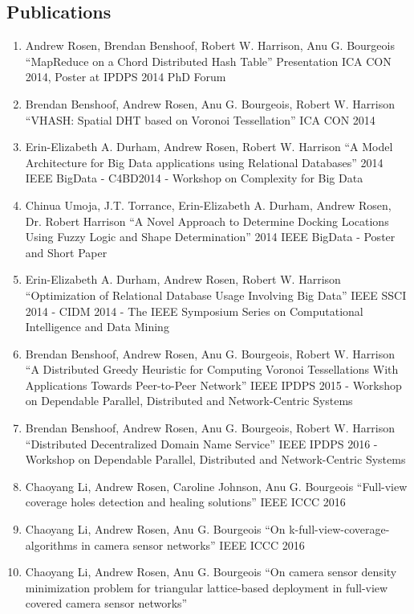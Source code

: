 \documentclass{res}
\begin{document}
\begin{resume}
\section{Publications}
	\begin{enumerate}
	\item Andrew Rosen, Brendan Benshoof, Robert W. Harrison, Anu G. Bourgeois
			``MapReduce on a Chord Distributed Hash Table''
			Presentation ICA CON 2014, Poster at IPDPS 2014 PhD Forum
	\item Brendan Benshoof, Andrew Rosen, Anu G. Bourgeois, Robert W. Harrison
			``VHASH: Spatial DHT based on Voronoi Tessellation''
			ICA CON 2014
	\item  Erin-Elizabeth A. Durham, Andrew Rosen, Robert W. Harrison
    ``A Model Architecture for Big Data applications using Relational Databases''
    2014 IEEE BigData - C4BD2014 - Workshop on Complexity for Big Data
    \item Chinua Umoja, J.T. Torrance, Erin-Elizabeth A. Durham, Andrew Rosen, Dr. Robert Harrison
    	``A Novel Approach to Determine Docking Locations Using Fuzzy Logic and Shape Determination''
    	2014 IEEE BigData - Poster and Short Paper
    \item  Erin-Elizabeth A. Durham, Andrew Rosen, Robert W. Harrison
    ``Optimization of Relational Database Usage Involving Big Data''
     IEEE SSCI 2014 - CIDM 2014 - The IEEE Symposium Series on Computational Intelligence and Data Mining
	\item Brendan Benshoof, Andrew Rosen, Anu G. Bourgeois, Robert W. Harrison
	 ``A Distributed Greedy Heuristic for Computing Voronoi Tessellations With Applications Towards Peer-to-Peer Network''
	IEEE IPDPS 2015 - Workshop on Dependable Parallel, Distributed and Network-Centric Systems
	\item Brendan Benshoof, Andrew Rosen, Anu G. Bourgeois, Robert W. Harrison
	``Distributed Decentralized Domain Name Service''
	IEEE IPDPS 2016 - Workshop on Dependable Parallel, Distributed and Network-Centric Systems
	\item Chaoyang Li, Andrew Rosen, Caroline Johnson, Anu G. Bourgeois 
	``Full-view coverage holes detection and healing solutions''
	IEEE ICCC 2016
	\item Chaoyang Li, Andrew Rosen, Anu G. Bourgeois 
	``On k-full-view-coverage-algorithms in camera sensor networks''
	IEEE ICCC 2016
	\item Chaoyang Li, Andrew Rosen, Anu G. Bourgeois
	``On camera sensor density minimization problem for triangular lattice-based deployment in full-view covered camera sensor networks'' 

\end{enumerate}
\end{resume}
\end{document}
